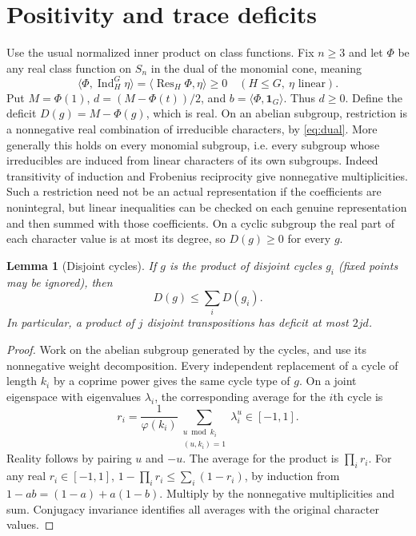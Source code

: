 \documentclass[11pt]{article}
\newtheorem{lemma}[theorem]{Lemma}
\theoremstyle{remark}
\newcommand{\Ind}{\operatorname{Ind}}
\newcommand{\Res}{\operatorname{Res}}
\newcommand{\one}{\mathbf 1}
\begin{document}
\section{Positivity and trace deficits}
Use the usual normalized inner product on class functions. Fix $n\ge3$ and let $\Phi$ be any real class function on $S_n$ in the dual of the monomial cone, meaning
\begin{equation}\label{eq:dual}
 \langle\Phi,\Ind_H^G\eta\rangle=\langle\Res_H\Phi,\eta\rangle\ge0
 \quad (H\le G,\ \eta\text{ linear}).
\end{equation}
Put $M=\Phi(1)$, $d=(M-\Phi(t))/2$, and $b=\langle\Phi,\one_G\rangle$. Thus $d\ge0$. Define the deficit $D(g)=M-\Phi(g)$, which is real. On an abelian subgroup, restriction is a nonnegative real combination of irreducible characters, by \eqref{eq:dual}. More generally this holds on every monomial subgroup, i.e. every subgroup whose irreducibles are induced from linear characters of its own subgroups. Indeed transitivity of induction and Frobenius reciprocity give nonnegative multiplicities. Such a restriction need not be an actual representation if the coefficients are nonintegral, but linear inequalities can be checked on each genuine representation and then summed with those coefficients. On a cyclic subgroup the real part of each character value is at most its degree, so $D(g)\ge0$ for every $g$.

\begin{lemma}[Disjoint cycles]\label{lem:cycles}
If $g$ is the product of disjoint cycles $g_i$ (fixed points may be ignored), then
\[ D(g)\le\sum_i D(g_i). \]
In particular, a product of $j$ disjoint transpositions has deficit at most $2jd$.
\end{lemma}
\begin{proof}
Work on the abelian subgroup generated by the cycles, and use its nonnegative weight decomposition. Every independent replacement of a cycle of length $k_i$ by a coprime power gives the same cycle type of $g$. On a joint eigenspace with eigenvalues $\lambda_i$, the corresponding average for the $i$th cycle is
\[
 r_i=\frac{1}{\varphi(k_i)}\sum_{\substack{u\bmod k_i\\(u,k_i)=1}}\lambda_i^u\in[-1,1].
\]
Reality follows by pairing $u$ and $-u$. The average for the product is $\prod_i r_i$. For any real $r_i\in[-1,1]$, $1-\prod_i r_i\le\sum_i(1-r_i)$, by induction from $1-ab=(1-a)+a(1-b)$. Multiply by the nonnegative multiplicities and sum. Conjugacy invariance identifies all averages with the original character values.
\end{proof}
\end{document}
